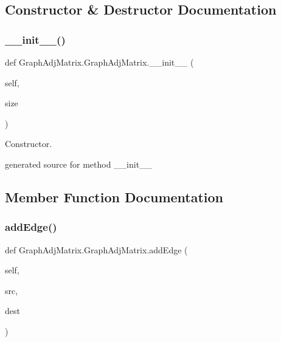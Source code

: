 \subsection{Constructor \& Destructor Documentation}
\hypertarget{class_graph_adj_matrix_1_1_graph_adj_matrix_a18085a97b3716427398dfe0eb2e3db9f}{}\label{class_graph_adj_matrix_1_1_graph_adj_matrix_a18085a97b3716427398dfe0eb2e3db9f} 
\subsubsection{\texorpdfstring{\+\_\+\+\_\+init\+\_\+\+\_\+()}{\_\_init\_\_()}}
{\footnotesize\ttfamily def Graph\+Adj\+Matrix.\+Graph\+Adj\+Matrix.\+\_\+\+\_\+init\+\_\+\+\_\+ (\begin{DoxyParamCaption}\item[{}]{self,  }\item[{}]{size }\end{DoxyParamCaption})}



Constructor. 

\begin{DoxyVerb}generated source for method __init__ \end{DoxyVerb}
 

\subsection{Member Function Documentation}
\hypertarget{class_graph_adj_matrix_1_1_graph_adj_matrix_ade007b6875b17bc0e56b08b27ab97de5}{}\label{class_graph_adj_matrix_1_1_graph_adj_matrix_ade007b6875b17bc0e56b08b27ab97de5} 
\subsubsection{\texorpdfstring{add\+Edge()}{addEdge()}}
{\footnotesize\ttfamily def Graph\+Adj\+Matrix.\+Graph\+Adj\+Matrix.\+add\+Edge (\begin{DoxyParamCaption}\item[{}]{self,  }\item[{}]{src,  }\item[{}]{dest }\end{DoxyParamCaption})}



